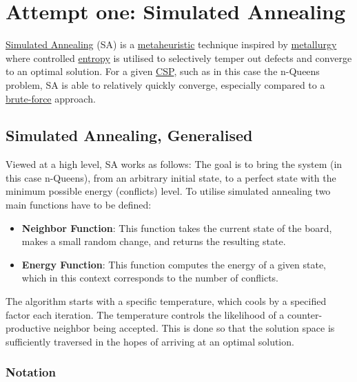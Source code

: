 \documentclass{article}
\begin{document}
\section{Attempt one: Simulated Annealing}
\href{https://en.wikipedia.org/wiki/Randomized_algorithm}{Simulated Annealing} (SA) is a \href{https://en.wikipedia.org/wiki/Metaheuristic}{metaheuristic} technique inspired by
\href{https://en.wikipedia.org/wiki/Metallurgy#:~:text=Metallurgy%20is%20a%20domain%20of,which%20are%20known%20as%20alloys.}{metallurgy} where controlled 
\href{https://en.wikipedia.org/wiki/Entropy}{entropy} is utilised to selectively temper out defects and converge to an optimal solution. For a given
\href{https://en.wikipedia.org/wiki/Constraint_satisfaction_problem}{CSP}, such as in this case the n-Queens problem, SA is able to relatively quickly converge,
especially compared to a \href{https://en.wikipedia.org/wiki/Brute-force_attack}{brute-force} approach.

\subsection{Simulated Annealing, Generalised}
Viewed at a high level, SA works as follows: The goal is to bring the system (in this case n-Queens), from an arbitrary initial state,
to a perfect state with the minimum possible energy (conflicts) level.
To utilise simulated annealing two main functions have to be defined:

\begin{itemize}
    \item \textbf{Neighbor Function}: This function takes the current state of the board, makes a small random change, and returns the resulting state.
    \item \textbf{Energy Function}: This function computes the energy of a given state, which in this context corresponds to the number of conflicts.
\end{itemize}

The algorithm starts with a specific temperature, which cools by a specified factor each iteration.
The temperature controls the likelihood of a counter-productive neighbor being accepted.
This is done so that the solution space is sufficiently traversed in the hopes of arriving at an optimal solution.

\subsubsection{Notation}
\end{document}
